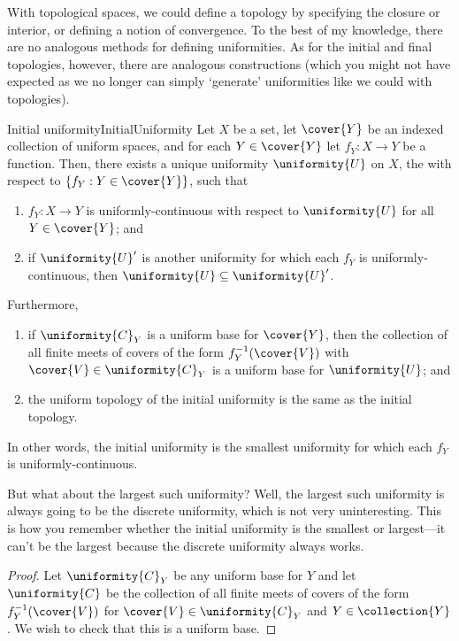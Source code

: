 With topological spaces, we could define a topology by specifying the closure or interior, or defining a notion of convergence.  To the best of my knowledge, there are no analogous methods for defining uniformities.  As for the initial and final topologies, however, there are analogous constructions (which you might not have expected as we no longer can simply `generate' uniformities like we could with topologies).
\begin{prp}{Initial uniformity}{InitialUniformity}
Let $X$ be a set, let $\cover{Y}$ be an indexed collection of uniform spaces, and for each $Y\in \cover{Y}$ let $f_Y:X\rightarrow Y$ be a function.  Then, there exists a unique uniformity $\uniformity{U}$ on $X$, the  with respect to $\{ f_Y:Y\in \cover{Y}\}$, such that
\begin{enumerate}
\item $f_Y:X\rightarrow Y$ is uniformly-continuous with respect to $\uniformity{U}$ for all $Y\in \cover{Y}$; and
\item if $\uniformity{U}'$ is another uniformity for which each $f_Y$ is uniformly-continuous, then $\uniformity{U}\subseteq \uniformity{U}'$.
\end{enumerate}

Furthermore,
\begin{enumerate}
\item if $\uniformity{C}_Y$ is a uniform base for $\cover{Y}$, then the collection of all finite meets of covers of the form $f_Y^{-1}(\cover{V})$ with $\cover{V}\in \uniformity{C}_Y$ is a uniform base for $\uniformity{U}$; and
\item the uniform topology of the initial uniformity is the same as the initial topology.
\end{enumerate}
\begin{rmk}
In other words, the initial uniformity is the smallest uniformity for which each $f_Y$ is uniformly-continuous.
\end{rmk}
\begin{rmk}
But what about the largest such uniformity?  Well, the largest such uniformity is always going to be the discrete uniformity, which is not very uninteresting.  This is how you remember whether the initial uniformity is the smallest or largest---it can't be the largest because the discrete uniformity always works.
\end{rmk}
\begin{proof}
Let $\uniformity{C}_Y$ be any uniform base for $Y$ and let $\uniformity{C}$ be the collection of all finite meets of covers of the form $f_Y^{-1}(\cover{V})$ for $\cover{V}\in \uniformity{C}_Y$ and $Y\in \collection{Y}$.  We wish to check that this is a uniform base.


\end{proof}
\end{prp}
